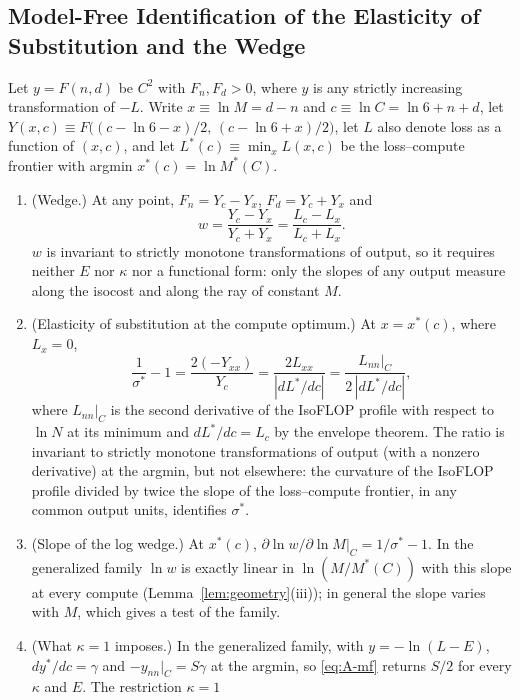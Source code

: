 \subsection{Model-Free Identification of the Elasticity of Substitution and the Wedge}\label{app:modelfree}

\begin{proposition}\label{prop:A-modelfree}
Let $y=F(n,d)$ be $C^2$ with $F_n,F_d>0$, where $y$ is any strictly increasing transformation of $-L$. Write
$x\equiv\ln M=d-n$ and $c\equiv\ln C=\ln6+n+d$, let $Y(x,c)\equiv F\big((c-\ln6-x)/2,\,(c-\ln6+x)/2\big)$, let $L$ also
denote loss as a function of $(x,c)$, and let $L^*(c)\equiv\min_xL(x,c)$ be the loss--compute frontier with argmin
$x^*(c)=\ln M^*(C)$.
\begin{enumerate}
\item[(i)] (Wedge.) At any point, $F_n=Y_c-Y_x$, $F_d=Y_c+Y_x$ and
\[
w=\frac{Y_c-Y_x}{Y_c+Y_x}=\frac{L_c-L_x}{L_c+L_x}.
\]
$w$ is invariant to strictly monotone transformations of output, so it requires neither $E$ nor $\kappa$ nor a
functional form: only the slopes of any output measure along the isocost and along the ray of constant $M$.
\item[(ii)] (Elasticity of substitution at the compute optimum.) At $x=x^*(c)$, where $L_x=0$,
\begin{equation}\label{eq:A-mf}
\frac1{\sigma^*}-1=\frac{2(-Y_{xx})}{Y_c}=\frac{2L_{xx}}{|dL^*/dc|}=\frac{L_{nn}|_C}{2\,|dL^*/dc|},
\end{equation}
where $L_{nn}|_C$ is the second derivative of the IsoFLOP profile with respect to $\ln N$ at its minimum and
$dL^*/dc=L_c$ by the envelope theorem. The ratio is invariant to strictly monotone transformations of output (with a nonzero
derivative) at the argmin, but not elsewhere: the curvature of the IsoFLOP profile divided by twice the slope of the loss--compute frontier,
in any common output units, identifies $\sigma^*$.
\item[(iii)] (Slope of the log wedge.) At $x^*(c)$, $\partial\ln w/\partial\ln M|_C=1/\sigma^*-1$. In the generalized
family $\ln w$ is exactly linear in $\ln(M/M^*(C))$ with this slope at every compute (Lemma~\ref{lem:geometry}(iii)); in
general the slope varies with $M$, which gives a test of the family.
\item[(iv)] (What $\kappa=1$ imposes.) In the generalized family, with $y=-\ln(L-E)$, $dy^*/dc=\gamma$ and
$-y_{nn}|_C=S\gamma$ at the argmin, so \eqref{eq:A-mf} returns $S/2$ for every $\kappa$ and $E$. The restriction $\kappa=1$

\end{enumerate}
\end{proposition}
